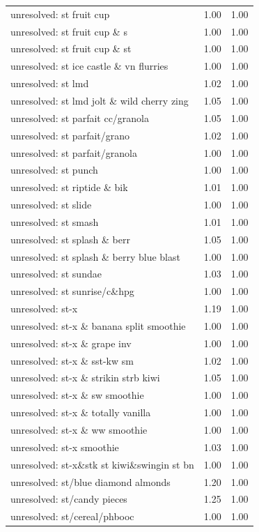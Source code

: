 \begin{table}
\begin{tabular}{lrr}
unresolved: st fruit cup & 1.00 & 1.00 \\
unresolved: st fruit cup \& s & 1.00 & 1.00 \\
unresolved: st fruit cup \& st & 1.00 & 1.00 \\
unresolved: st ice castle \& vn flurries & 1.00 & 1.00 \\
unresolved: st lmd & 1.02 & 1.00 \\
unresolved: st lmd jolt \& wild cherry zing & 1.05 & 1.00 \\
unresolved: st parfait cc/granola & 1.05 & 1.00 \\
unresolved: st parfait/grano & 1.02 & 1.00 \\
unresolved: st parfait/granola & 1.00 & 1.00 \\
unresolved: st punch & 1.00 & 1.00 \\
unresolved: st riptide \& bik & 1.01 & 1.00 \\
unresolved: st slide & 1.00 & 1.00 \\
unresolved: st smash & 1.01 & 1.00 \\
unresolved: st splash \& berr & 1.05 & 1.00 \\
unresolved: st splash \& berry blue blast & 1.00 & 1.00 \\
unresolved: st sundae & 1.03 & 1.00 \\
unresolved: st sunrise/c\&hpg & 1.00 & 1.00 \\
unresolved: st-x & 1.19 & 1.00 \\
unresolved: st-x \& banana split smoothie & 1.00 & 1.00 \\
unresolved: st-x \& grape inv & 1.00 & 1.00 \\
unresolved: st-x \& sst-kw sm & 1.02 & 1.00 \\
unresolved: st-x \& strikin strb kiwi & 1.05 & 1.00 \\
unresolved: st-x \& sw smoothie & 1.00 & 1.00 \\
unresolved: st-x \& totally vanilla & 1.00 & 1.00 \\
unresolved: st-x \& ww smoothie & 1.00 & 1.00 \\
unresolved: st-x smoothie & 1.03 & 1.00 \\
unresolved: st-x\&stk st kiwi\&swingin st bn & 1.00 & 1.00 \\
unresolved: st/blue diamond almonds & 1.20 & 1.00 \\
unresolved: st/candy pieces & 1.25 & 1.00 \\
unresolved: st/cereal/phbooc & 1.00 & 1.00 \\

\end{tabular}
\end{table}

